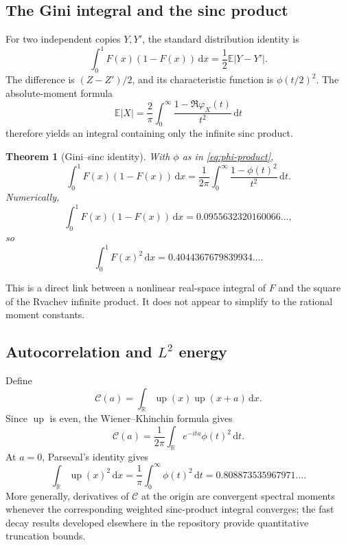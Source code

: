 \documentclass[11pt,oneside]{article}
\newtheorem{theorem}{Theorem}[section]
\theoremstyle{definition}
\newcommand{\F}{F}
\newcommand{\upf}{\operatorname{up}}
\newcommand{\E}{\mathbb E}
\newcommand{\R}{\mathbb R}
\newcommand{\dd}{\,\mathrm d}
\begin{document}
\subsection{The Gini integral and the sinc product}

For two independent copies \(Y,Y'\), the standard distribution identity is
\begin{equation}\label{eq:Gini-prob}
 \int_0^1\F(x)(1-\F(x))\dd x
 =\frac12\E|Y-Y'|.
\end{equation}
The difference is \((Z-Z')/2\), and its characteristic function is
\(\phi(t/2)^2\).  The absolute-moment formula
\begin{equation}\label{eq:absolute-char}
 \E|X|=\frac2\pi\int_0^\infty
 \frac{1-\Re\varphi_X(t)}{t^2}\dd t
\end{equation}
therefore yields an integral containing only the infinite sinc product.

\begin{theorem}[Gini--sinc identity]\label{thm:gini-sinc}
With \(\phi\) as in \cref{eq:phi-product},
\begin{equation}\label{eq:Gini-sinc}
 \boxed{\displaystyle
 \int_0^1\F(x)(1-\F(x))\dd x
 =\frac1{2\pi}\int_0^\infty
 \frac{1-\phi(t)^2}{t^2}\dd t.}
\end{equation}
Numerically,
\begin{equation}\label{eq:Gini-numeric}
 \int_0^1\F(x)(1-\F(x))\dd x
 =0.0955632320160066\ldots,
\end{equation}
so
\begin{equation}\label{eq:F2-numeric}
 \int_0^1\F(x)^2\dd x
 =0.4044367679839934\ldots.
\end{equation}
\end{theorem}

This is a direct link between a nonlinear real-space integral of \(\F\) and the square
of the Rvachev infinite product.  It does not appear to simplify to the rational moment
constants.

\subsection{Autocorrelation and \(L^2\) energy}

Define
\begin{equation}\label{eq:Cautocorr}
 \mathcal C(a)=\int_\R\upf(x)\upf(x+a)\dd x.
\end{equation}
Since \(\upf\) is even, the Wiener--Khinchin formula gives
\begin{equation}\label{eq:autocorr-Fourier}
 \mathcal C(a)=\frac1{2\pi}
 \int_\R e^{-ita}\phi(t)^2\dd t.
\end{equation}
At \(a=0\), Parseval's identity gives
\begin{equation}\label{eq:up-L2}
 \int_\R\upf(x)^2\dd x
 =\frac1\pi\int_0^\infty\phi(t)^2\dd t
 =0.808873535967971\ldots.
\end{equation}
More generally, derivatives of \(\mathcal C\) at the origin are convergent spectral
moments whenever the corresponding weighted sinc-product integral converges; the fast
decay results developed elsewhere in the repository provide quantitative truncation
bounds.
\end{document}
